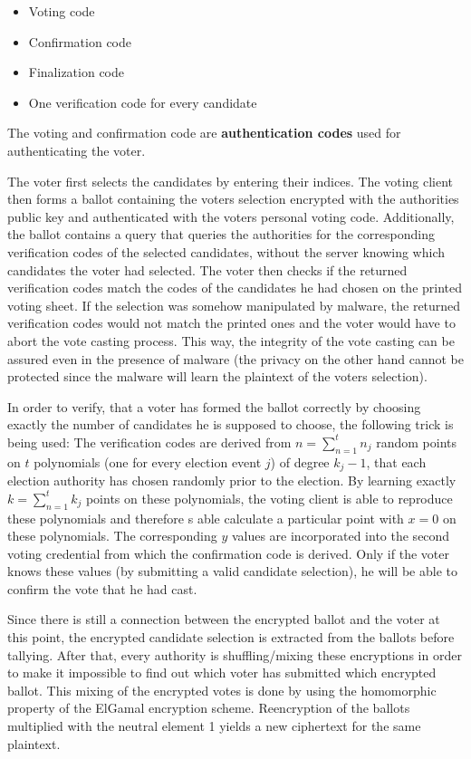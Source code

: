 \documentclass[a4paper,12pt]{report}
\begin{document}
\begin{itemize}
	\item Voting code
	\item Confirmation code
	\item Finalization code
	\item One verification code for every candidate
\end{itemize}

The voting and confirmation code are \textbf{authentication codes} used for authenticating the voter.

The voter first selects the candidates by entering their indices. The voting client then forms a ballot containing the voters selection encrypted with the authorities public key and authenticated with the voters personal voting code. Additionally, the ballot contains a query that queries the authorities for the corresponding verification codes of the selected candidates, without the server knowing which candidates the voter had selected. The voter then checks if the returned verification codes match the codes of the candidates he had chosen on the printed voting sheet. If the selection was somehow manipulated by malware, the returned verification codes would not match the printed ones and the voter would have to abort the vote casting process. This way, the integrity of the vote casting can be assured even in the presence of malware (the privacy on the other hand cannot be protected since the malware will learn the plaintext of the voters selection).

In order to verify, that a voter has formed the ballot correctly by choosing exactly the number of candidates he is supposed to choose, the following trick is being used: The verification codes are derived from $n = \sum_{n=1}^{t} n_j$ random points on $t$ polynomials (one for every election event $j$) of degree $k_j - 1$, that each election authority has chosen randomly prior to the election. By learning exactly $k = \sum_{n=1}^{t} k_j$ points on these polynomials, the voting client is able to reproduce these polynomials and therefore s able calculate a particular point with $x=0$ on these polynomials. The corresponding $y$ values are incorporated into the second voting credential from which the confirmation code is derived. Only if the voter knows these values (by submitting a valid candidate selection), he will be able to confirm the vote that he had cast.

Since there is still a connection between the encrypted ballot and the voter at this point, the encrypted candidate selection is extracted from the ballots before tallying. After that, every authority is shuffling/mixing these encryptions in order to make it impossible to find out which voter has submitted which encrypted ballot. This mixing of the encrypted votes is done by using the homomorphic property of the ElGamal encryption scheme. Reencryption of the ballots multiplied with the neutral element 1 yields a new ciphertext for the same plaintext.
\end{document}

